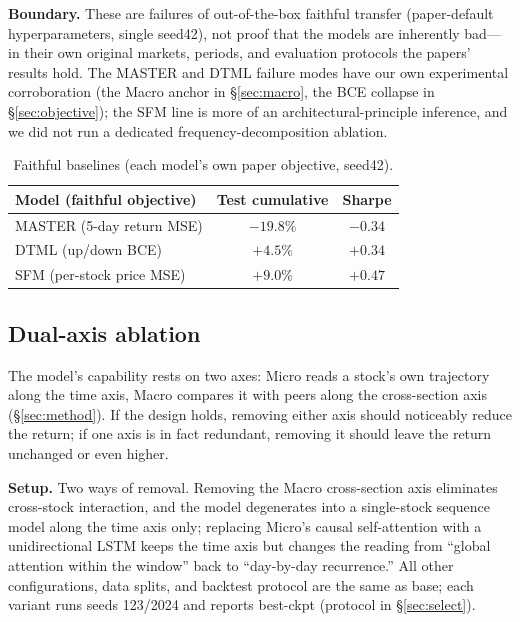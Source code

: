 \documentclass[a4paper,11pt]{article}
\begin{document}
\textbf{Boundary.} These are failures of out-of-the-box faithful
transfer (paper-default hyperparameters, single seed42), not proof that the
models are inherently bad---in their own original markets, periods, and
evaluation protocols the papers' results hold. The MASTER and DTML failure
modes have our own experimental corroboration (the Macro anchor in
\S\ref{sec:macro}, the BCE collapse in \S\ref{sec:objective}); the SFM line is
more of an architectural-principle inference, and we did not run a dedicated
frequency-decomposition ablation.

\begin{table}[H]
\centering
\caption{Faithful baselines (each model's own paper objective, seed42).}
\label{tab:faithful}
\begin{tabular}{lcc}
\toprule
Model (faithful objective) & Test cumulative & Sharpe \\
\midrule
MASTER (5-day return MSE) & $-19.8\%$ & $-0.34$ \\
DTML (up/down BCE)        & $+4.5\%$  & $+0.34$ \\
SFM (per-stock price MSE) & $+9.0\%$  & $+0.47$ \\
\bottomrule
\end{tabular}
\end{table}

\subsection{Dual-axis ablation}\label{sec:pillars}
The model's capability rests on two axes: Micro reads a stock's own trajectory
along the time axis, Macro compares it with peers along the cross-section axis
(\S\ref{sec:method}). If the design holds, removing either axis should
noticeably reduce the return; if one axis is in fact redundant, removing it
should leave the return unchanged or even higher.

\textbf{Setup.} Two ways of removal. Removing the Macro cross-section
axis eliminates cross-stock interaction, and the model degenerates into a
single-stock sequence model along the time axis only; replacing Micro's causal
self-attention with a unidirectional LSTM keeps the time axis but changes the
reading from ``global attention within the window'' back to ``day-by-day
recurrence.'' All other configurations, data splits, and backtest protocol are
the same as base; each variant runs seeds 123/2024 and reports best-ckpt
(protocol in \S\ref{sec:select}).
\end{document}
